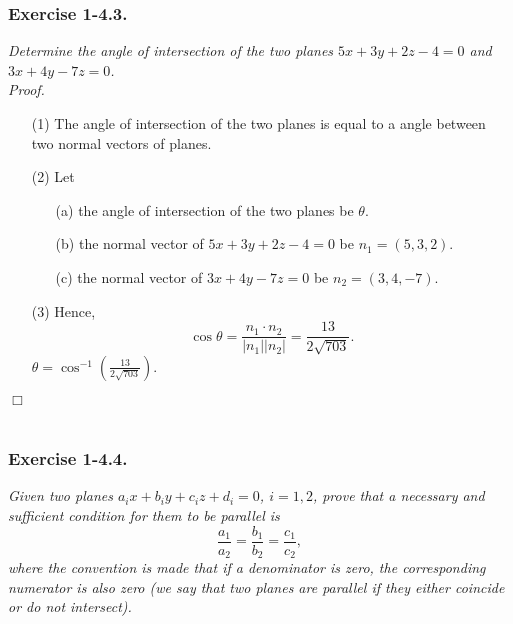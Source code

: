 \documentclass{article}
\begin{document}



\subsubsection*{Exercise 1-4.3.}
\emph{Determine the angle of intersection of the two planes
$5x+3y+2z-4=0$ and $3x+4y-7z=0$.} \\



\emph{Proof.}
\begin{enumerate}
\item[(1)]
The angle of intersection of the two planes
is equal to a angle between two normal vectors of planes.
\item[(2)]
Let
  \begin{enumerate}
  \item[(a)]
  the angle of intersection of the two planes be $\theta$.
  \item[(b)]
  the normal vector of $5x+3y+2z-4=0$ be $n_1 = (5,3,2)$.
  \item[(c)]
  the normal vector of $3x+4y-7z=0$ be $n_2 = (3,4,-7)$.
  \end{enumerate}
\item[(3)]
Hence,
$$\cos\theta = \frac{n_1 \cdot n_2}{|n_1||n_2|} = \frac{13}{2\sqrt{703}}.$$
$\theta = \cos^{-1}\left( \frac{13}{2\sqrt{703}} \right)$.
\end{enumerate}
$\Box$ \\\\






\subsubsection*{Exercise 1-4.4.}
\emph{Given two planes $a_i x + b_i y + c_i z + d_i = 0$, $i = 1, 2$,
prove that a necessary and sufficient condition for them to be parallel is
\[
  \frac{a_1}{a_2} = \frac{b_1}{b_2} = \frac{c_1}{c_2},
\]
where the convention is made that if a denominator is zero,
the corresponding numerator is also zero
(we say that two planes are parallel if they either coincide or do not intersect).} \\
\end{document}
